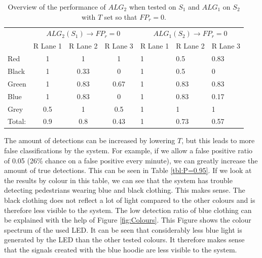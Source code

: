 \begin{table}[]
	\centering	
\begin{tabular}{l|ccc|lll}
	& \multicolumn{3}{c|}{$ALG_2(S_1) \rightarrow FP_r = 0$} & \multicolumn{3}{c}{$ALG_1(S_2) \rightarrow FP_r = 0$} \\
	& R Lane 1        & R Lane 2        & R Lane 3        & R Lane 1         & R Lane 2        & R Lane 3        \\ \hline
	Red    & 1               & 1               & 1               & 1                & 0.5             & 0.83            \\
	Black  & 1               & 0.33            & 0               & 1                & 0.5             & 0               \\
	Green  & 1               & 0.83            & 0.67            & 1                & 0.83            & 0.83            \\
	Blue   & 1               & 0.83            & 0               & 1                & 0.83            & 0.17            \\
	Grey   & 0.5             & 1               & 0.5             & 1                & 1               & 1               \\ \hline
	Total: & 0.9             & 0.8             & 0.43            & 1                & 0.73            & 0.57           
\end{tabular}
	\caption{Overview of the performance of $ALG_2$ when tested on $S_1$ and $ALG_1$ on $S_2$ with $T$ set so that $FP_r = 0$. \label{tbl:P=1}}
\end{table}

The amount of detections can be increased by lowering $T$, but this leads to more false classifications by the system. For example, if we allow a false positive ratio of 0.05 (26\% chance on a false positive every minute), we can greatly increase the amount of true detections. This can be seen in Table \ref{tbl:P=0.95}. If we look at the results by colour in this table, we can see that the system has trouble detecting pedestrians wearing blue and black clothing. This makes sense. The black clothing does not reflect a lot of light compared to the other colours and is therefore less visible to the system. The low detection ratio of blue clothing can be explained with the help of Figure \ref{fig:Colours}. This Figure shows the colour spectrum of the used LED. It can be seen that considerably less blue light is generated by the LED than the other tested colours. It therefore makes sense that the signals created with the blue hoodie are less visible to the system.

